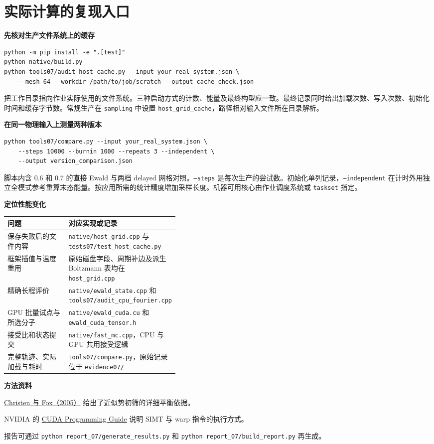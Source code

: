 \documentclass[12pt,a4paper]{article}
\newcommand{\code}[1]{\texttt{\small #1}}
\newcommand{\shead}[1]{\medskip\par\noindent\textbf{\color{navy}#1}\par}
\begin{document}
\section*{实际计算的复现入口}
\shead{先核对生产文件系统上的缓存}
\begin{lstlisting}
python -m pip install -e ".[test]"
python native/build.py
python tools07/audit_host_cache.py --input your_real_system.json \
    --mesh 64 --workdir /path/to/job/scratch --output cache_check.json
\end{lstlisting}
把工作目录指向作业实际使用的文件系统。三种启动方式的计数、能量及最终构型应一致。最终记录同时给出加载次数、写入次数、初始化时间和缓存字节数。常规生产在 \code{sampling} 中设置 \code{host\_grid\_cache}，路径相对输入文件所在目录解析。
\shead{在同一物理输入上测量两种版本}
\begin{lstlisting}
python tools07/compare.py --input your_real_system.json \
    --steps 10000 --burnin 1000 --repeats 3 --independent \
    --output version_comparison.json
\end{lstlisting}
脚本内含 0.6 和 0.7 的直接 Ewald 与两档 delayed 网格对照。\code{--steps} 是每次生产的尝试数。初始化单列记录，\code{--independent} 在计时外用独立全模式参考重算末态能量。按应用所需的统计精度增加采样长度。机器可用核心由作业调度系统或 \code{taskset} 指定。
\shead{定位性能变化}
\begin{center}\small\begin{tabularx}{\linewidth}{@{}p{0.40\linewidth}X@{}}\toprule
问题 & 对应实现或记录\\\midrule
保存失败后的文件内容 & \code{native/host\_grid.cpp} 与 \code{tests07/test\_host\_cache.py}\\
框架插值与温度重用 & 原始磁盘字段、周期补边及派生 Boltzmann 表均在 \code{host\_grid.cpp}\\
精确长程评价 & \code{native/ewald\_state.cpp} 和 \code{tools07/audit\_cpu\_fourier.cpp}\\
GPU 批量试点与所选分子 & \code{native/ewald\_cuda.cu} 和 \code{ewald\_cuda\_tensor.h}\\
接受比和状态提交 & \code{native/fast\_mc.cpp}，CPU 与 GPU 共用接受逻辑\\
完整轨迹、实际加载与耗时 & \code{tools07/compare.py}，原始记录位于 \code{evidence07/}\\
\bottomrule\end{tabularx}\end{center}
\shead{方法资料}
\noindent\href{https://doi.org/10.1198/106186005X76983}{Christen 与 Fox（2005）} 给出了近似势初筛的详细平衡依据。\par\noindent NVIDIA 的 \href{https://docs.nvidia.com/cuda/cuda-programming-guide/}{CUDA Programming Guide} 说明 SIMT 与 warp 指令的执行方式。\par\noindent 报告可通过 \code{python report\_07/generate\_results.py} 和 \code{python report\_07/build\_report.py} 再生成。
\end{document}
